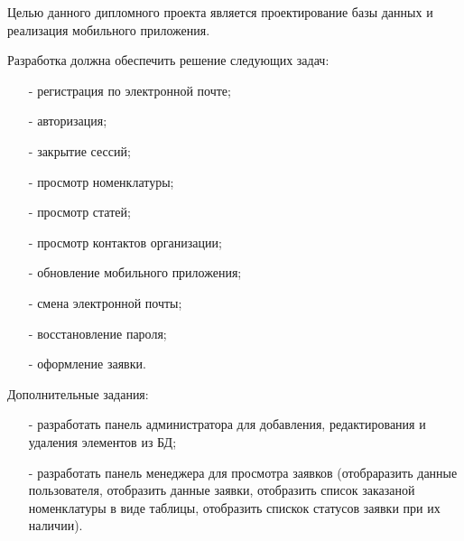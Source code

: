 Целью данного дипломного проекта является проектирование базы данных и реализация мобильного приложения.

Разработка должна обеспечить решение следующих задач:

\begin{itemize}
  \item[-] регистрация по электронной почте;
  \item[-] авторизация;
  \item[-] закрытие сессий;
  \item[-] просмотр номенклатуры;
  \item[-] просмотр статей;
  \item[-] просмотр контактов организации;
  \item[-] обновление мобильного приложения;
  \item[-] смена электронной почты;
  \item[-] восстановление пароля;
  \item[-] оформление заявки.
\end{itemize}

Дополнительные задания:

\begin{itemize}
  \item[-] разработать панель администратора для добавления, редактирования и удаления элементов из БД;
  \item[-] разработать панель менеджера для просмотра заявков
  (отобраразить данные пользователя,
  отобразить данные заявки,
  отобразить список заказаной номенклатуры в виде таблицы,
  отобразить спискок статусов заявки при их наличии).
\end{itemize}
